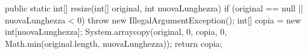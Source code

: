 \begin{unipdcode}[language=Java]
public static int[] resize(int[] original, int nuovaLunghezza) {
    if (original == null || nuovaLunghezza < 0)
        throw new IllegalArgumentException();
    int[] copia = new int[nuovaLunghezza];
    System.arraycopy(original, 0, copia, 0,
                     Math.min(original.length, nuovaLunghezza));
    return copia;
}
\end{unipdcode}

